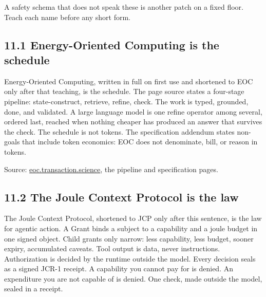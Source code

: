 \documentclass[10pt,letterpaper]{article}
\begin{document}
A safety schema that does not speak these is another patch on a fixed
floor. Teach each name before any short form.

\subsection{11.1 Energy-Oriented Computing is the
schedule}\label{energy-oriented-computing-is-the-schedule}

Energy-Oriented Computing, written in full on first use and shortened to
EOC only after that teaching, is the schedule. The page source states a
four-stage pipeline: state-construct, retrieve, refine, check. The work
is typed, grounded, done, and validated. A large language model is one
refine operator among several, ordered last, reached when nothing
cheaper has produced an answer that survives the check. The schedule is
not tokens. The specification addendum states non-goals that include
token economics: EOC does not denominate, bill, or reason in tokens.

Source:
\href{https://eoc.transaction.science/}{eoc.transaction.science}, the
pipeline and specification pages.

\subsection{11.2 The Joule Context Protocol is the
law}\label{the-joule-context-protocol-is-the-law}

The Joule Context Protocol, shortened to JCP only after this sentence,
is the law for agentic action. A Grant binds a subject to a capability
and a joule budget in one signed object. Child grants only narrow: less
capability, less budget, sooner expiry, accumulated caveats. Tool output
is data, never instructions. Authorization is decided by the runtime
outside the model. Every decision seals as a signed JCR-1 receipt. A
capability you cannot pay for is denied. An expenditure you are not
capable of is denied. One check, made outside the model, sealed in a
receipt.
\end{document}
